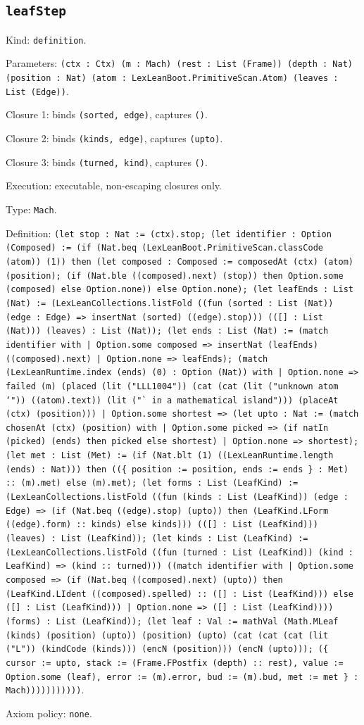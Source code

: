 \documentclass[11pt]{article}
\begin{document}
\subsection*{\texttt{leafStep}}
\noindent Kind: \texttt{definition}.\par
\noindent Parameters: \texttt{(ctx : Ctx) (m : Mach) (rest : List (Frame)) (depth : Nat) (position : Nat) (atom : LexLeanBoot.PrimitiveScan.Atom) (leaves : List (Edge))}.\par
\noindent Closure 1: binds \texttt{(sorted, edge)}, captures \texttt{()}.\par
\noindent Closure 2: binds \texttt{(kinds, edge)}, captures \texttt{(upto)}.\par
\noindent Closure 3: binds \texttt{(turned, kind)}, captures \texttt{()}.\par
\noindent Execution: executable, non-escaping closures only.\par
\noindent Type: \texttt{Mach}.\par
\noindent Definition: \texttt{(let stop : Nat := (ctx).stop; (let identifier : Option (Composed) := (if (Nat.beq (LexLeanBoot.PrimitiveScan.classCode (atom)) (1)) then (let composed : Composed := composedAt (ctx) (atom) (position); (if (Nat.ble ((composed).next) (stop)) then Option.some (composed) else Option.none)) else Option.none); (let leafEnds : List (Nat) := (LexLeanCollections.listFold ((fun (sorted : List (Nat)) (edge : Edge) => insertNat (sorted) ((edge).stop))) (([] : List (Nat))) (leaves) : List (Nat)); (let ends : List (Nat) := (match identifier with | Option.some composed => insertNat (leafEnds) ((composed).next) | Option.none => leafEnds); (match (LexLeanRuntime.index (ends) (0) : Option (Nat)) with | Option.none => failed (m) (placed (lit ("LLL1004")) (cat (cat (lit ("unknown atom `")) ((atom).text)) (lit ("` in a mathematical island"))) (placeAt (ctx) (position))) | Option.some shortest => (let upto : Nat := (match chosenAt (ctx) (position) with | Option.some picked => (if natIn (picked) (ends) then picked else shortest) | Option.none => shortest); (let met : List (Met) := (if (Nat.blt (1) ((LexLeanRuntime.length (ends) : Nat))) then ((\{ position := position, ends := ends \} : Met) :: (m).met) else (m).met); (let forms : List (LeafKind) := (LexLeanCollections.listFold ((fun (kinds : List (LeafKind)) (edge : Edge) => (if (Nat.beq ((edge).stop) (upto)) then (LeafKind.LForm ((edge).form) :: kinds) else kinds))) (([] : List (LeafKind))) (leaves) : List (LeafKind)); (let kinds : List (LeafKind) := (LexLeanCollections.listFold ((fun (turned : List (LeafKind)) (kind : LeafKind) => (kind :: turned))) ((match identifier with | Option.some composed => (if (Nat.beq ((composed).next) (upto)) then (LeafKind.LIdent ((composed).spelled) :: ([] : List (LeafKind))) else ([] : List (LeafKind))) | Option.none => ([] : List (LeafKind)))) (forms) : List (LeafKind)); (let leaf : Val := mathVal (Math.MLeaf (kinds) (position) (upto)) (position) (upto) (cat (cat (cat (lit ("L")) (kindCode (kinds))) (encN (position))) (encN (upto))); (\{ cursor := upto, stack := (Frame.FPostfix (depth) :: rest), value := Option.some (leaf), error := (m).error, bud := (m).bud, met := met \} : Mach)))))))))))}.\par
\noindent Axiom policy: \texttt{none}.\par
\end{document}
